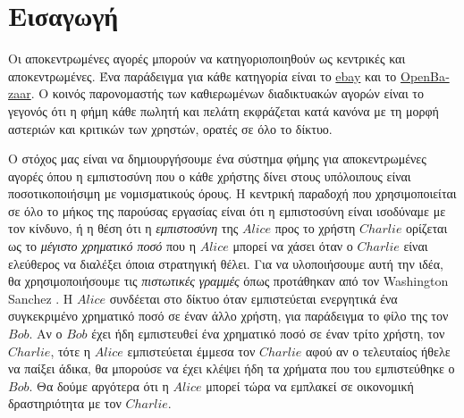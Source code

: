 \section{Εισαγωγή}
  Οι αποκεντρωμένες αγορές μπορούν να κατηγοριοποιηθούν ως κεντρικές και αποκεντρωμένες. Ένα παράδειγμα για κάθε κατηγορία
  είναι το \href{http://www.ebay.com}{\textlatin{ebay}} και το \href{https://openbazaar.org/}{\textlatin{OpenBazaar}}. Ο
  κοινός παρονομαστής των καθιερωμένων διαδικτυακών αγορών είναι το γεγονός ότι η φήμη κάθε πωλητή και πελάτη εκφράζεται κατά
  κανόνα με τη μορφή αστεριών και κριτικών των χρηστών, ορατές σε όλο το δίκτυο.

  Ο στόχος μας είναι να δημιουργήσουμε ένα σύστημα φήμης για αποκεντρωμένες αγορές όπου η εμπιστοσύνη που ο κάθε χρήστης δίνει
  στους υπόλοιπους είναι ποσοτικοποιήσιμη με νομισματικούς όρους. Η κεντρική παραδοχή που χρησιμοποιείται σε όλο το μήκος της
  παρούσας εργασίας είναι ότι η εμπιστοσύνη είναι ισοδύναμε με τον κίνδυνο, ή η θέση ότι η \textit{εμπιστοσύνη} της $Alice$
  προς το χρήστη $Charlie$ ορίζεται ως το \textit{μέγιστο χρηματικό ποσό} που η $Alice$ μπορεί να χάσει όταν ο $Charlie$ είναι
  ελεύθερος να διαλέξει όποια στρατηγική θέλει. Για να υλοποιήσουμε αυτή την ιδέα, θα χρησιμοποιήσουμε τις \textit{πιστωτικές
  γραμμές} όπως προτάθηκαν από τον \textlatin{Washington Sanchez} \cite{loc}. Η $Alice$ συνδέεται στο δίκτυο όταν εμπιστεύεται
  ενεργητικά ένα συγκεκριμένο χρηματικό ποσό σε έναν άλλο χρήστη, για παράδειγμα το φίλο της τον $Bob$. Αν ο $Bob$ έχει ήδη
  εμπιστευθεί ένα χρηματικό ποσό σε έναν τρίτο χρήστη, τον $Charlie$, τότε η $Alice$ εμπιστεύεται έμμεσα τον $Charlie$ αφού αν
  ο τελευταίος ήθελε να παίξει άδικα, θα μπορούσε να έχει κλέψει ήδη τα χρήματα που του εμπιστεύθηκε ο $Bob$. Θα δούμε
  αργότερα ότι η $Alice$ μπορεί τώρα να εμπλακεί σε οικονομική δραστηριότητα με τον $Charlie$.

